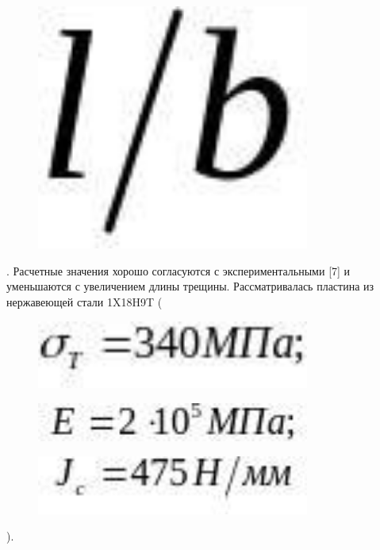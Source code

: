 \begin{figure}[H]
	\centering
	\includegraphics[width=0.8\textwidth]{assets/1180}
	\caption*{}
\end{figure}. Расчетные значения хорошо
согласуются с экспериментальными {[}7{]} и уменьшаются с увеличением
длины трещины. Рассматривалась пластина из нержавеющей стали 1X18H9T
(\begin{figure}[H]
	\centering
	\includegraphics[width=0.8\textwidth]{assets/1181}
	\caption*{}
\end{figure}\begin{figure}[H]
	\centering
	\includegraphics[width=0.8\textwidth]{assets/1182}
	\caption*{}
\end{figure}\begin{figure}[H]
	\centering
	\includegraphics[width=0.8\textwidth]{assets/1183}
	\caption*{}
\end{figure}).
